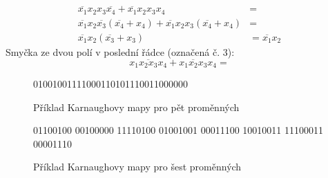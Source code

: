 {\begin{align}
       \overline{x_1}x_2x_3\overline{x_4} +
       \overline{x_1}x_2x_3x_4                                &=               \\ \nonumber
       \overline{x_1}x_2\overline{x_3}(\overline{x_4}+x_4) +  
       \overline{x_1}x_2x_3(\overline{x_4}+x_4)               &=               \\ \nonumber
       \overline{x_1}x_2(\overline{x_3}+x_3)                  &= 
       \overline{x_1}x_2 
     \end{align}
     Smyčka ze dvou polí v poslední řádce (označená č. 3):
     \begin{equation}
       x_1\overline{x_2x_3}x_4 + x_1\overline{x_2}x_3x_4 = 
     \end{equation}     
     \begin{figure}[ht!]
         \centering
            {01001001111000110101110011000000}{}  
        \caption{Příklad Karnaughovy mapy pro pět proměnných}\label{CES:karnaugh_5}
      \end{figure}

     \begin{figure}[hb!]
         \centering                 
          {{0}{1}{1}{0}{0}{1}{0}{0}%
           {0}{0}{1}{0}{0}{0}{0}{0}%
           {1}{1}{1}{1}{0}{1}{0}{0}%
           {0}{1}{0}{0}{1}{0}{0}{1}%
           {0}{0}{0}{1}{1}{1}{0}{0}%
           {1}{0}{0}{1}{0}{0}{1}{1}%
           {1}{1}{1}{0}{0}{0}{1}{1}%
           {0}{0}{0}{0}{1}{1}{1}{0}}{}%
        \caption{Příklad Karnaughovy mapy pro šest proměnných}\label{CES:karnaugh_6}
      \end{figure}

} %
\printbibliography[title={Seznam literatury}, heading=subbibliography]
